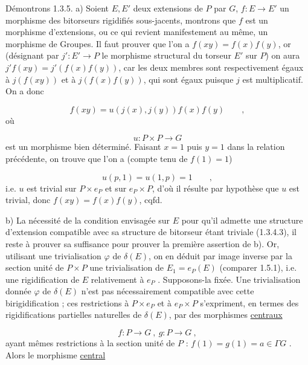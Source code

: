 Démontrons 1.3.5.  a)  Soient $E,E'$ deux extensions de $P$ par $G$, $f : E \longrightarrow E'$ un morphisme des bitorseurs rigidifiés sous-jacents, montrons que $f$ est un morphisme d'extensions, ou ce qui revient manifestement au même, un morphisme de Groupes. Il faut prouver que l'on a $f(xy) = f(x)f(y)$, or (désignant par $j' : E' \longrightarrow P$ le morphisme structural du torseur $E'$ sur $P$) on aura $j'f(xy) = j'(f(x)f(y))$, car les deux membres sont respectivement égaux à $j(f(xy))$ et à $j(f(x)f(y))$, qui sont égaux puisque $j$ est multiplicatif. On a donc

\begin{equation*}
f(xy) = u(j(x),j(y))f(x)f(y) \qquad ,
\end{equation*}
où

\begin{equation*}
u : P \times P \longrightarrow G
\end{equation*}
est un morphisme bien déterminé. Faisant $x=1$ puis $y=1$ dans la relation précédente, on trouve que l'on a (compte tenu de $f(1)=1$)

\begin{equation*}
u(p,1) = u(1,p) = 1 \qquad ,
\end{equation*}
i.e. $u$ est trivial sur $P \times e_P$ et sur $e_P \times P$, d'où il résulte par hypothèse que $u$ est trivial, donc $f(xy) = f(x)f(y)$, cqfd.

b)  La nécessité de la condition envisagée sur $E$ pour qu'il admette une structure d'extension compatible avec sa structure de bitorseur étant triviale (1.3.4.3), il reste à prouver sa suffisance pour prouver la première assertion de b). Or, utilisant une trivialisation $\varphi$
de $\delta(E)$, on en déduit par image inverse par la section unité de $P \times P$ une trivialisation de $E_1 = e_P(E)$ (comparer 1.5.1), i.e. une rigidification de $E$ relativement à $e_P$ . Supposons-la fixée. Une trivialisation donnée $\varphi$ de $\delta(E)$ n'est pas nécessairement compatible avec cette birigidification ; ces restrictions à $P \times e_P$ et à $e_P \times P$ s'expriment, en termes des rigidifications partielles naturelles de $\delta(E)$, par des morphismes \underline{centraux}

\begin{equation*}
f : P \longrightarrow G \ , \ g : P \longrightarrow G \ ,
\end{equation*}
ayant mêmes restrictions à la section unité de $P$ : $f(1) = g(1) = a \in \Gamma G$ . Alors le morphisme \underline{central}

